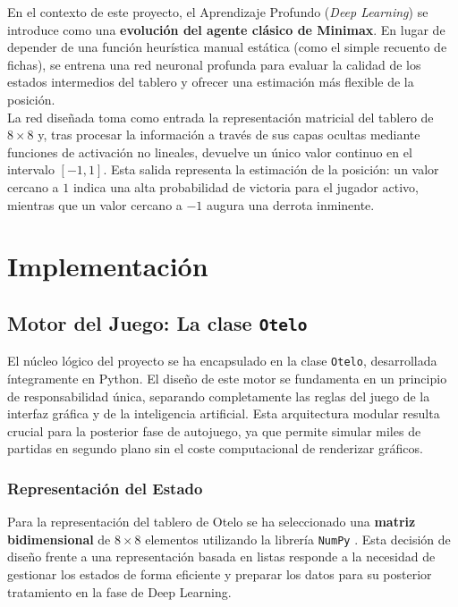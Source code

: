 \documentclass[conference]{IEEEtran}
\begin{document}
En el contexto de este proyecto, el Aprendizaje Profundo (\textit{Deep Learning}) se introduce como una \textbf{evolución del agente clásico de Minimax}. 
En lugar de depender de una función heurística manual estática (como el simple recuento de fichas), se entrena una red neuronal profunda para 
evaluar la calidad de los estados intermedios del tablero y ofrecer una estimación más flexible de la posición.\\

La red diseñada toma como entrada la representación matricial del tablero de $8 \times 8$ y, tras procesar la información a través de sus capas 
ocultas mediante funciones de activación no lineales, devuelve un único valor continuo en el intervalo $[-1, 1]$. Esta salida representa la estimación de 
la posición: un valor cercano a $1$ indica una alta probabilidad de victoria para el jugador activo, mientras que un valor cercano a $-1$ augura una derrota inminente.\\

\section{Implementación}

\subsection{Motor del Juego: La clase \texttt{Otelo}}
El núcleo lógico del proyecto se ha encapsulado en la clase \texttt{Otelo}, desarrollada íntegramente en Python. El diseño de este 
motor se fundamenta en un principio de responsabilidad única, separando completamente las reglas del juego de la interfaz gráfica y 
de la inteligencia artificial. Esta arquitectura modular resulta crucial para la posterior fase de autojuego, ya que permite simular miles 
de partidas en segundo plano sin el coste computacional de renderizar gráficos.\\

\subsubsection{Representación del Estado}

Para la representación del tablero de Otelo se ha seleccionado una \textbf{matriz bidimensional} de $8 \times 8$ elementos utilizando la librería \texttt{NumPy} \cite{numpy}.
Esta decisión de diseño frente a una representación basada en listas responde a la necesidad de gestionar los estados de forma eficiente y preparar los datos para su posterior tratamiento en la fase de Deep Learning.\\
\end{document}
